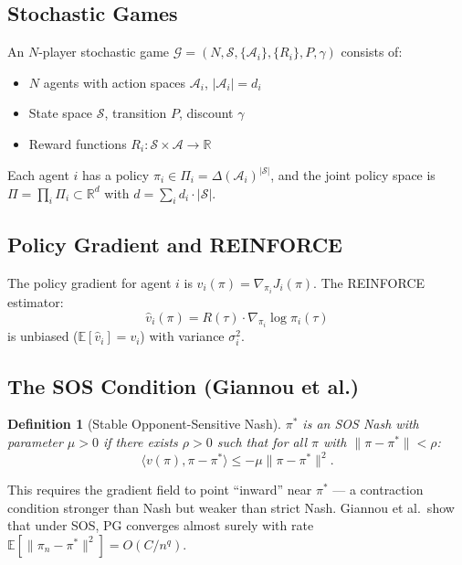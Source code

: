 \documentclass[11pt,a4paper]{article}
\newtheorem{definition}[theorem]{Definition}
\newcommand{\R}{\mathbb{R}}
\newcommand{\E}{\mathbb{E}}
\newcommand{\ip}[2]{\langle #1, #2 \rangle}
\newcommand{\norm}[1]{\|#1\|}
\begin{document}
\subsection{Stochastic Games}

An $N$-player stochastic game $\mathcal{G} = (N, \mathcal{S},
\{\mathcal{A}_i\}, \{R_i\}, P, \gamma)$ consists of:
\begin{itemize}
    \item $N$ agents with action spaces $\mathcal{A}_i$, $|\mathcal{A}_i| = d_i$
    \item State space $\mathcal{S}$, transition $P$, discount $\gamma$
    \item Reward functions $R_i : \mathcal{S} \times \mathcal{A} \to \R$
\end{itemize}

Each agent $i$ has a policy $\pi_i \in \Pi_i = \Delta(\mathcal{A}_i)^{|\mathcal{S}|}$,
and the joint policy space is $\Pi = \prod_i \Pi_i \subset \R^d$ with
$d = \sum_i d_i \cdot |\mathcal{S}|$.

\subsection{Policy Gradient and REINFORCE}

The policy gradient for agent $i$ is $v_i(\pi) = \nabla_{\pi_i} J_i(\pi)$.
The REINFORCE estimator:
\begin{equation}
    \hat{v}_i(\pi) = R(\tau) \cdot \nabla_{\pi_i} \log \pi_i(\tau)
\end{equation}
is unbiased ($\E[\hat{v}_i] = v_i$) with variance $\sigma_i^2$.

\subsection{The SOS Condition (Giannou et al.)}

\begin{definition}[Stable Opponent-Sensitive Nash]
$\pi^*$ is an SOS Nash with parameter $\mu > 0$ if there exists $\rho > 0$
such that for all $\pi$ with $\norm{\pi - \pi^*} < \rho$:
\begin{equation}\label{eq:sos}
    \ip{v(\pi)}{\pi - \pi^*} \leq -\mu \norm{\pi - \pi^*}^2.
\end{equation}
\end{definition}

This requires the gradient field to point ``inward'' near $\pi^*$ ---
a contraction condition stronger than Nash but weaker than strict Nash.
Giannou et al.\ show that under SOS, PG converges almost surely with
rate $\E[\norm{\pi_n - \pi^*}^2] = O(C/n^q)$.
\end{document}
